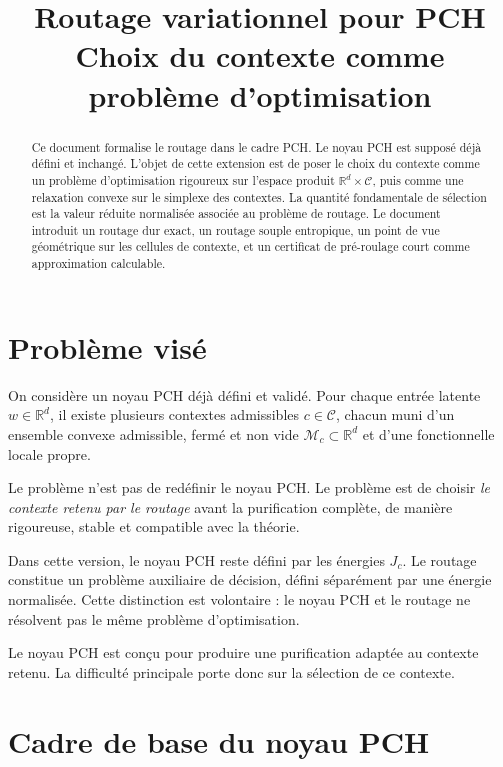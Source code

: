 \documentclass[11pt,a4paper]{article}
\title{Routage variationnel pour PCH\\
\large Choix du contexte comme problème d'optimisation}
\author{}
\date{}
\newcommand{\R}{\mathbb R}
\newcommand{\Mcal}{\mathcal M}
\newcommand{\Ccal}{\mathcal C}
\begin{document}
\maketitle

\begin{abstract}
Ce document formalise le routage dans le cadre PCH. Le noyau PCH est supposé déjà défini et inchangé. L'objet de cette extension est de poser le choix du contexte comme un problème d'optimisation rigoureux sur l'espace produit \(\R^d\times\Ccal\), puis comme une relaxation convexe sur le simplexe des contextes. La quantité fondamentale de sélection est la valeur réduite normalisée associée au problème de routage. Le document introduit un routage dur exact, un routage souple entropique, un point de vue géométrique sur les cellules de contexte, et un certificat de pré-roulage court comme approximation calculable.
\end{abstract}

\tableofcontents

\section{Problème visé}

On considère un noyau PCH déjà défini et validé. Pour chaque entrée latente \(w\in\R^d\), il existe plusieurs contextes admissibles \(c\in\Ccal\), chacun muni d'un ensemble convexe admissible, fermé et non vide \(\Mcal_c\subset\R^d\) et d'une fonctionnelle locale propre.

Le problème n'est pas de redéfinir le noyau PCH. Le problème est de choisir \emph{le contexte retenu par le routage} avant la purification complète, de manière rigoureuse, stable et compatible avec la théorie.

Dans cette version, le noyau PCH reste défini par les énergies \(J_c\). Le routage constitue un problème auxiliaire de décision, défini séparément par une énergie normalisée. Cette distinction est volontaire : le noyau PCH et le routage ne résolvent pas le même problème d'optimisation.

Le noyau PCH est conçu pour produire une purification adaptée au contexte retenu. La difficulté principale porte donc sur la sélection de ce contexte.

\section{Cadre de base du noyau PCH}
\end{document}
